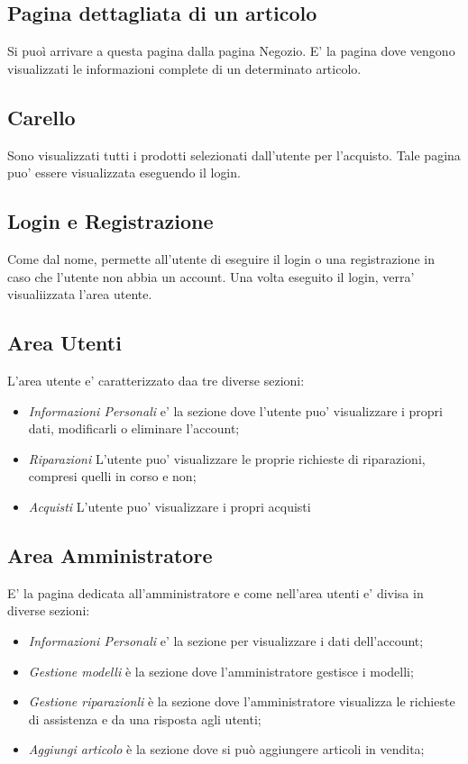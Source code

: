 \subsection{Pagina dettagliata di un articolo}

Si puoì arrivare a questa pagina dalla pagina Negozio. 
E' la pagina dove vengono visualizzati
le informazioni complete di un determinato articolo.

\subsection{Carello}

Sono visualizzati tutti i prodotti selezionati dall'utente per l'acquisto. Tale pagina puo' essere
visualizzata eseguendo il login.

\subsection{Login e Registrazione}

Come dal nome, permette all'utente di eseguire il login o una registrazione in caso che l'utente 
non abbia un account. Una volta eseguito il login, verra' visualiizzata l'area utente.

\subsection{Area Utenti}

L'area utente e' caratterizzato daa tre diverse sezioni: 

\begin{itemize}
	\item \textit{Informazioni Personali} e' la sezione dove l'utente puo' visualizzare i propri dati,
	modificarli o eliminare l'account;
	\item\textit{Riparazioni} L'utente puo' visualizzare le proprie richieste di riparazioni, compresi
	quelli in corso e non;
	\item \textit{Acquisti } L'utente puo' visualizzare i propri acquisti
\end{itemize}

\subsection{Area Amministratore}

E' la pagina dedicata all'amministratore e come nell'area utenti e' divisa in diverse sezioni:

\begin{itemize}
	\item \textit{Informazioni Personali} e' la sezione per visualizzare i dati dell'account;
	\item \textit{Gestione modelli} è la sezione dove l'amministratore gestisce i modelli;
	\item \textit{Gestione riparazionli} è la sezione dove l'amministratore visualizza le richieste
	di assistenza e da una risposta agli utenti;
	\item \textit{Aggiungi articolo} è la sezione dove si può aggiungere articoli in vendita;

\end{itemize}